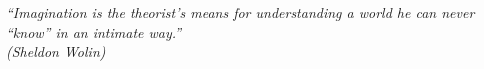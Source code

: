 \documentclass[
12pt,				%
openright,			%
oneside,			%
a4paper,			%
english, %
french, %
spanish, %
brazil, %
table,
xcdraw
]{abntex2}
\begin{document}
	
	
	\frenchspacing 
	
	
	\imprimircapa
	
	\imprimirfolhaderosto*


   	
	
	\begin{epigrafe}
		\vspace*{\fill}
		\begin{flushright}
			\textit{ ``Imagination is the theorist's means for
			understanding a world he can never ``know'' in an intimate way.'' \\
			(Sheldon Wolin)	}
		\end{flushright}
	\end{epigrafe}
	
		
	
			
			
	
	\listoffigures* 
    
	\cleardoublepage
\end{document}
